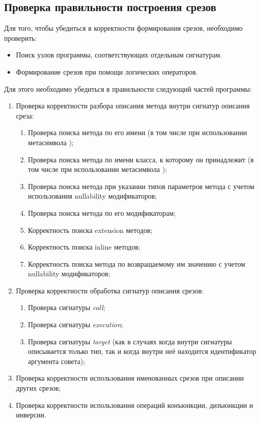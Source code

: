 \subsection{Проверка правильности построения срезов}
\label{subs:pointcut_testing_program}
Для того, чтобы убедиться в корректности формирования срезов, необходимо проверить:
\begin{itemize}
	\item Поиск узлов программы, соответствующих отдельным сигнатурам.
	\item Формирование срезов при помощи логических операторов.
\end{itemize}
Для этого необходимо убедиться в правильности следующий частей программы:
\begin{enumerate}
    \item \label{list:method_items_check}Проверка корректности разбора описания метода внутри сигнатур описания среза:
    \begin{enumerate}
        \item \label{list:method_name_check}Проверка поиска метода по его имени (в том числе при использовании метасимвола \quotes{*});
        \item \label{list:class_name_check}Проверка поиска метода по имени класса, к которому он принадлежит (в том числе при использовании метасимвола \quotes{*});
        \item \label{list:method_params_check}Проверка поиска метода при указании типов параметров метода с учетом использования nullability модификаторов;
        \item \label{list:method_modifiers_check}Проверка поиска метода по его модификаторам;
        \item \label{list:method_extension_check}Корректность поиска extension методов;
        \item \label{list:method_inline_check}Корректность поиска inline методов;
        \item \label{list:method_return_value_check}Корректность поиска метода по возвращаемому им значению с учетом nullability модификаторов;
    \end{enumerate}
    \item \label{list:pointcut_items_check}Проверка корректности обработка сигнатур описания срезов:
    \begin{enumerate}
        \item \label{list:call_check}Проверка сигнатуры \textit{call};
        \item \label{list:execution_check}Проверка сигнатуры \textit{execution};
        \item \label{list:target_check}Проверка сигнатуры \textit{target} (как в случаях когда внутри сигнатуры описывается только тип, так и когда внутри неё находится идентификатор аргумента совета);
    \end{enumerate}
    \item \label{list:reference_pointcut_check}Проверка корректности использования именованных срезов при описании других срезов;
    \item \label{list:logic_operations_check}Проверка корректности использования операций конъюнкции, дизъюнкции и инверсии.
\end{enumerate}
